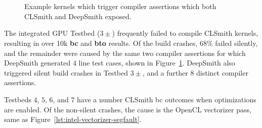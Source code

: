 \begin{figure}
  \centering %
  \\%
  \subfloat[Assertion \emph{iter != pointerOrigMap.end()}.]{%
    \noindent\mbox{\parbox{\columnwidth}{\usebox{\BeigIterAssertion}}}%
    \label{lst:beig-iter-assertion}
  }\\%
  \caption{Example kernels which trigger compiler assertions which both CLSmith and DeepSmith exposed.}%
  \label{lst:beig-assertions}
\end{figure}

The integrated GPU Testbed ($3\pm$) frequently failed to compile CLSmith kernels, resulting in over 10k \textbf{bc} and \textbf{bto} results.
Of the build crashes, 68\% failed silently, and the remainder were caused by the same two compiler assertions for which DeepSmith generated 4 line test cases, shown in Figure~\ref{lst:beig-assertions}. DeepSmith also triggered silent build crashes in Testbed $3\pm$, and a further 8 distinct compiler assertions.

Testbeds $4$, $5$, $6$, and $7$ have a number CLSmith bc outcomes when optimizations are enabled. Of the non-silent crashes, the cause is the OpenCL vectorizer pass, same as Figure~\ref{lst:intel-vectorizer-segfault}. 

